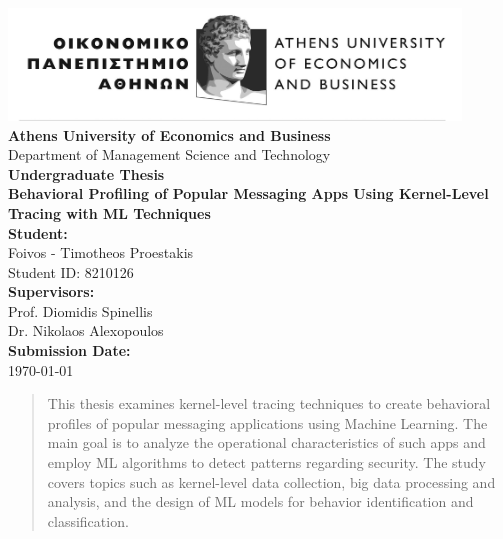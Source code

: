 \documentclass[a4paper,12pt]{report}
\begin{document}
\begin{titlepage}
    \begin{center}
        \vspace*{1.5cm}

        \includegraphics[width=0.9\textwidth]{./aueb_logo.png}\\[1cm]

        {\Large \textbf{Athens University of Economics and Business}}\\[0.5cm]
        {\large Department of Management Science and Technology}\\[1.5cm]

        {\Huge \textbf{Undergraduate Thesis}}\\[1.2cm]
        {\Large \textbf{Behavioral Profiling of Popular Messaging Apps Using Kernel-Level Tracing with ML Techniques}}\\[2cm]

        \textbf{Student:}\\
        Foivos - Timotheos Proestakis\\
        Student ID: 8210126\\[1.5cm]

        \textbf{Supervisors:}\\
        Prof. Diomidis Spinellis \\
        Dr. Nikolaos Alexopoulos\\[1.5cm]

        \vfill
        \textbf{Submission Date:}\\
        \today
        \vspace*{1cm}
    \end{center}
\end{titlepage}
\clearpage


\begin{abstract}
This thesis examines kernel-level tracing techniques to create behavioral profiles of popular messaging applications using Machine Learning. The main goal is to analyze the operational characteristics of such apps and employ ML algorithms to detect patterns regarding security. The study covers topics such as kernel-level data collection, big data processing and analysis, and the design of ML models for behavior identification and classification.
\end{abstract}
\clearpage
\end{document}
